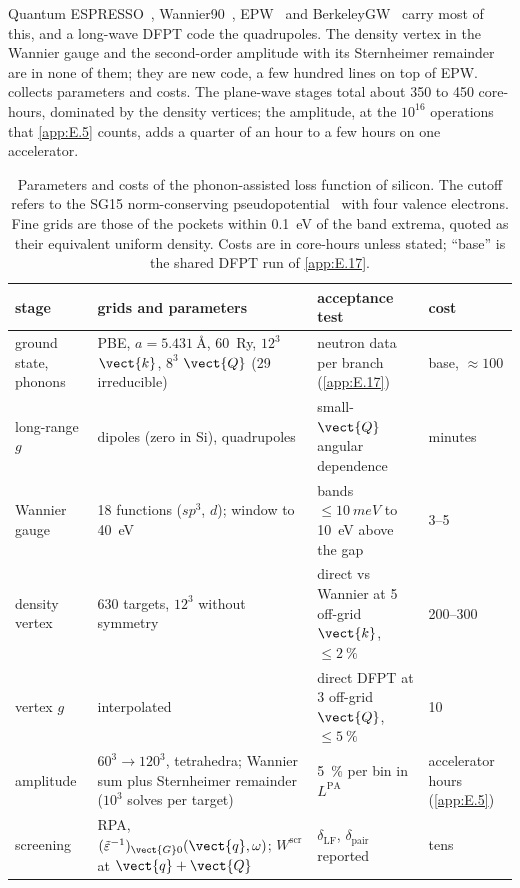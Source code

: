 Quantum ESPRESSO~\cite{giannozzi2017advanced}, Wannier90~\cite{pizzi2020wannier90}, EPW~\cite{ponce2016epw} and BerkeleyGW~\cite{deslippe2012berkeleygw} carry most of this, and a long-wave DFPT code the quadrupoles. The density vertex in the Wannier gauge and the second-order amplitude with its Sternheimer remainder are in none of them; they are new code, a few hundred lines on top of EPW.  collects parameters and costs. The plane-wave stages total about 350 to 450 core-hours, dominated by the density vertices; the amplitude, at the $10^{16}$ operations that \cref{app:E.5} counts, adds a quarter of an hour to a few hours on one accelerator.

\begin{table}[t]
  \centering
  \caption{Parameters and costs of the phonon-assisted loss function of silicon. The cutoff refers to the SG15 norm-conserving pseudopotential~\cite{schlipf2015optimization} with four valence electrons. Fine grids are those of the pockets within \SI{0.1}{eV} of the band extrema, quoted as their equivalent uniform density. Costs are in core-hours unless stated; ``base'' is the shared DFPT run of \cref{app:E.17}.}
  \label{tab:E14-params}
  \small
  \setlength{\tabcolsep}{4pt}
  \begin{tabular}{p{}p{}p{}p{}}
    \toprule
    stage & grids and parameters & acceptance test & cost \\
    \midrule
    ground state, phonons & PBE, $a = \SI{5.431}{\angstrom}$, \SI{60}{Ry}, $12^3$ $\vect{k}$, $8^3$ $\vect{Q}$ (29 irreducible) & neutron data per branch (\cref{app:E.17}) & base, $\approx 100$ \\
    long-range $g$ & dipoles (zero in Si), quadrupoles & small-$\vect{Q}$ angular dependence & minutes \\
    Wannier gauge & 18 functions ($sp^3$, $d$); window to \SI{40}{eV} & bands $\le\SI{10}{meV}$ to \SI{10}{eV} above the gap & 3--5 \\
    density vertex & 630 targets, $12^3$ without symmetry & direct vs Wannier at 5 off-grid $\vect{k}$, $\le\SI{2}{\percent}$ & 200--300 \\
    vertex $g$ & interpolated & direct DFPT at 3 off-grid $\vect{Q}$, $\le\SI{5}{\percent}$ & 10 \\
    amplitude & $60^3 \to 120^3$, tetrahedra; Wannier sum plus Sternheimer remainder ($10^3$ solves per target) & \SI{5}{\percent} per bin in $L^{\mathrm{PA}}$ & accelerator hours (\cref{app:E.5}) \\
    screening & RPA, $(\tilde\varepsilon^{-1})_{\vect{G}0}(\vect{q},\omega)$; $W^{\mathrm{scr}}$ at $\vect{q}+\vect{Q}$ & $\delta_{\mathrm{LF}}$, $\delta_{\mathrm{pair}}$ reported & tens \\
    \bottomrule
  \end{tabular}
\end{table}

